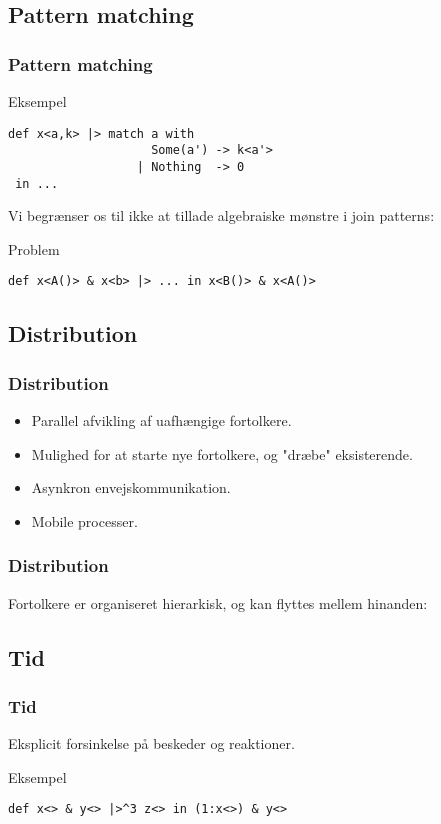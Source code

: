 \documentclass{beamer}
\begin{document}
\subsection{Pattern matching}
\begin{frame}[fragile]
\frametitle{Pattern matching}
\begin{block}{Eksempel}
\begin{lstlisting}
def x<a,k> |> match a with
                    Some(a') -> k<a'>
                  | Nothing  -> 0
 in ...
\end{lstlisting}
\end{block}
Vi begrænser os til ikke at tillade algebraiske mønstre i join patterns:
\begin{block}{Problem}
\begin{lstlisting}
def x<A()> & x<b> |> ... in x<B()> & x<A()>
\end{lstlisting}
\end{block}
\end{frame}


\subsection{Distribution}

\begin{frame}[fragile]
\frametitle{Distribution}
\begin{itemize}
\item
  Parallel afvikling af uafhængige fortolkere.

\item
  Mulighed for at starte nye fortolkere, og "dræbe" eksisterende.

\item
  Asynkron envejskommunikation.

\item
  Mobile processer.
\end{itemize}
\end{frame}

\begin{frame}[fragile]
\frametitle{Distribution}
Fortolkere er organiseret hierarkisk, og kan flyttes mellem hinanden:
\begin{center}
\end{center}
\end{frame}

\subsection{Tid}
\begin{frame}[fragile]
\frametitle{Tid}
Eksplicit forsinkelse på beskeder og reaktioner.
\begin{block}{Eksempel}
\begin{lstlisting}
def x<> & y<> |>^3 z<> in (1:x<>) & y<>
\end{lstlisting}
\end{block}
\end{frame}
\end{document}
